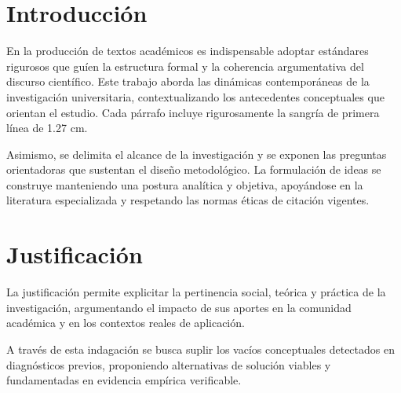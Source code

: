 \documentclass[12pt,letterpaper]{article}
\begin{document}
\clearpage
\tableofcontents

\clearpage
\listoftables

\clearpage
\listoffigures

\clearpage
\section{Introducción}

En la producción de textos académicos es indispensable adoptar estándares rigurosos que guíen la estructura formal y la coherencia argumentativa del discurso científico. Este trabajo aborda las dinámicas contemporáneas de la investigación universitaria, contextualizando los antecedentes conceptuales que orientan el estudio. Cada párrafo incluye rigurosamente la sangría de primera línea de 1.27 cm.

Asimismo, se delimita el alcance de la investigación y se exponen las preguntas orientadoras que sustentan el diseño metodológico. La formulación de ideas se construye manteniendo una postura analítica y objetiva, apoyándose en la literatura especializada y respetando las normas éticas de citación vigentes.

\clearpage
\section{Justificación}

La justificación permite explicitar la pertinencia social, teórica y práctica de la investigación, argumentando el impacto de sus aportes en la comunidad académica y en los contextos reales de aplicación.

A través de esta indagación se busca suplir los vacíos conceptuales detectados en diagnósticos previos, proponiendo alternativas de solución viables y fundamentadas en evidencia empírica verificable.
\end{document}
